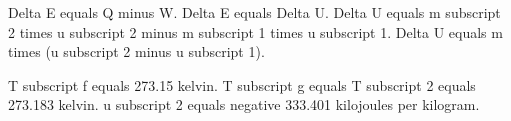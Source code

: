 Delta E equals Q minus W.  
Delta E equals Delta U.  
Delta U equals m subscript 2 times u subscript 2 minus m subscript 1 times u subscript 1.  
Delta U equals m times (u subscript 2 minus u subscript 1).  

T subscript f equals 273.15 kelvin.  
T subscript g equals T subscript 2 equals 273.183 kelvin.  
u subscript 2 equals negative 333.401 kilojoules per kilogram.